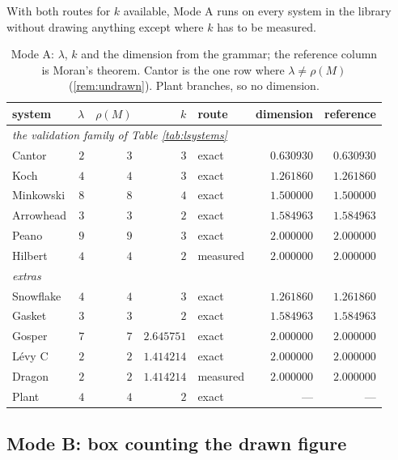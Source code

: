 \documentclass[11pt, a4paper]{article}
\theoremstyle{plain}
\theoremstyle{definition}
\theoremstyle{remark}
\begin{document}
With both routes for $k$ available, Mode A runs on every system in the
library without drawing anything except where $k$ has to be measured.


\begin{table}[H]
\centering
\begin{tabular}{lrrrlrr}
\hline
system & $\lambda$ & $\rho(M)$ & $k$ & route & dimension & reference \\
\hline
\multicolumn{7}{l}{\itshape the validation family of Table \ref{tab:lsystems}}\\
Cantor    & $2$ & $3$ & $3$        & exact    & $0.630930$ & $0.630930$ \\
Koch      & $4$ & $4$ & $3$        & exact    & $1.261860$ & $1.261860$ \\
Minkowski & $8$ & $8$ & $4$        & exact    & $1.500000$ & $1.500000$ \\
Arrowhead & $3$ & $3$ & $2$        & exact    & $1.584963$ & $1.584963$ \\
Peano     & $9$ & $9$ & $3$        & exact    & $2.000000$ & $2.000000$ \\
Hilbert   & $4$ & $4$ & $2$        & measured & $2.000000$ & $2.000000$ \\
\multicolumn{7}{l}{\itshape extras}\\
Snowflake & $4$ & $4$ & $3$        & exact    & $1.261860$ & $1.261860$ \\
Gasket    & $3$ & $3$ & $2$        & exact    & $1.584963$ & $1.584963$ \\
Gosper    & $7$ & $7$ & $2.645751$ & exact    & $2.000000$ & $2.000000$ \\
L\'evy C  & $2$ & $2$ & $1.414214$ & exact    & $2.000000$ & $2.000000$ \\
Dragon    & $2$ & $2$ & $1.414214$ & measured & $2.000000$ & $2.000000$ \\
Plant     & $4$ & $4$ & $2$        & exact    & ---        & ---        \\
\hline
\end{tabular}
\caption{Mode A: $\lambda$, $k$ and the dimension from the grammar; the reference column is Moran's theorem. 
Cantor is the one row where $\lambda\neq\rho(M)$ (\ref{rem:undrawn}). 
Plant branches, so no dimension.}
\label{tab:growth}
\end{table}

\subsection{Mode B: box counting the drawn figure}
\label{sec:modeb}
\end{document}
